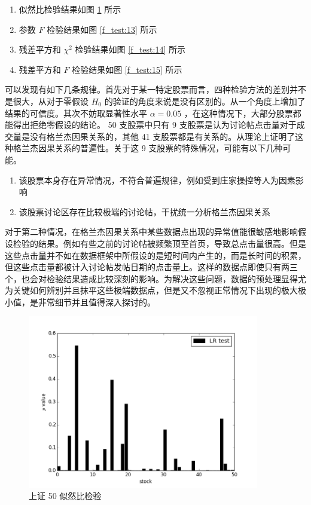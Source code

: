 \begin{enumerate}
  \item 似然比检验结果如图 \ref{f_test:12} 所示
  \item 参数 $F$ 检验结果如图 \ref{f_test:13} 所示
  \item 残差平方和 $\chi^{2}$ 检验结果如图 \ref{f_test:14} 所示
  \item 残差平方和 $F$ 检验结果如图 \ref{f_test:15} 所示
\end{enumerate}

可以发现有如下几条规律。首先对于某一特定股票而言，四种检验方法的差别并不是很大，从对于零假设 $H_{0}$ 的验证的角度来说是没有区别的。从一个角度上增加了结果的可信度。其次不妨取显著性水平 $\alpha=0.05$ ，在这种情况下，大部分股票都能得出拒绝零假设的结论。 50 支股票中只有 9 支股票是认为讨论帖点击量对于成交量是没有格兰杰因果关系的，其他 41 支股票都是有关系的。从理论上证明了这种格兰杰因果关系的普遍性。关于这 9 支股票的特殊情况，可能有以下几种可能。

\begin{enumerate}
  \item 该股票本身存在异常情况，不符合普遍规律，例如受到庄家操控等人为因素影响
  \item 该股票讨论区存在比较极端的讨论帖，干扰统一分析格兰杰因果关系
\end{enumerate}

对于第二种情况，在格兰杰因果关系中某些数据点出现的异常值能很敏感地影响假设检验的结果。例如有些之前的讨论帖被频繁顶至首页，导致总点击量很高。但是这些点击量并不如在数据框架中所假设的是短时间内产生的，而是长时间的积累，但这些点击量都被计入讨论帖发帖日期的点击量上。这样的数据点即使只有两三个，也会对检验结果造成比较深刻的影响。为解决这些问题，数据的预处理显得尤为关键如何辨别并且抹平这些极端数据点，但是又不忽视正常情况下出现的极大极小值，是非常细节并且值得深入探讨的。

\begin{figure}
  \centering
  \includegraphics[width=0.9\textwidth]{plots/granger_causality_test_on_sse_50_lrtest.png}
  \caption{上证 50 似然比检验}
  \label{f_test:12}
\end{figure}

